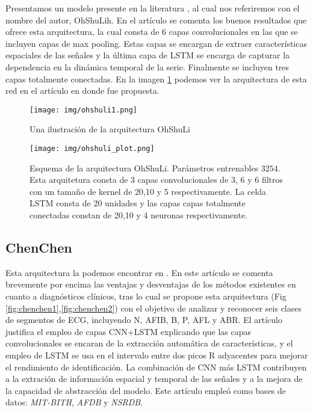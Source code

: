         Presentamos un modelo presente en la literatura \cite{ohshuli}, al cual nos referiremos con el nombre del autor, OhShuLih. En el artículo se comenta los buenos resultados que ofrece esta arquitectura, la cual consta de 6 capas convolucionales en las que se incluyen capas de max pooling. Estas capas se encargan de extraer características espaciales de las señales y la última capa de LSTM se encarga de capturar la dependencia en la dinámica temporal de la serie. Finalmente se incluyen tres capas totalmente conectadas. En la imagen \ref{fig:ohshuli_1} podemos ver la arquitectura de esta red en el artículo en donde fue propuesta. \\
        
        \begin{figure}[htpb]
            \centering
            \texttt{[image: img/ohshuli1.png]}
            \caption{Una ilustración de la arquitectura OhShuLi}
            \label{fig:ohshuli_1}
        \end{figure}
        
        \begin{figure}[htpb]
            \centering
            \texttt{[image: img/ohshuli\_plot.png]}
            \caption{Esquema de la arquitectura OhShuLi. Parámetros entrenables $3254$. Esta arquitetura consta de 3 capas convolucionales de 3, 6 y 6 filtros con un tamaño de kernel de 20,10 y 5 respectivamente. La celda LSTM consta de 20 unidades y las capas capas totalmente conectadas constan de 20,10 y 4 neuronas respectivamente.}
            \label{fig:ohshuli_2}
        \end{figure}
        
        
        
        
    \subsection{ChenChen}
    
        Esta arquitectura la podemos encontrar en \cite{chenchen}. En este artículo se comenta brevemente por encima las ventajas y desventajas de los métodos existentes en cuanto a diagnósticos clínicos, tras lo cual se propone esta arquitectura (Fig \ref{fig:chenchen1},\ref{fig:chenchen2}) con el objetivo de analizar y reconocer seis clases de segmentos de ECG, incluyendo N, AFIB, B, P, AFL y ABR. El artículo justifica el empleo de capas CNN+LSTM explicando que las capas convolucionales se encaran de la extracción automática de características, y el empleo de LSTM se usa en el intervalo entre dos picos R adyacentes para mejorar el rendimiento de identificación. La combinación de CNN más LSTM contribuyen a la extración de información espacial y temporal de las señales y a la mejora de la capacidad de abstracción del modelo. Este artículo empleó como bases de datos: \textit{MIT-BITH}, \textit{AFDB} y \textit{NSRDB}. \\
    
